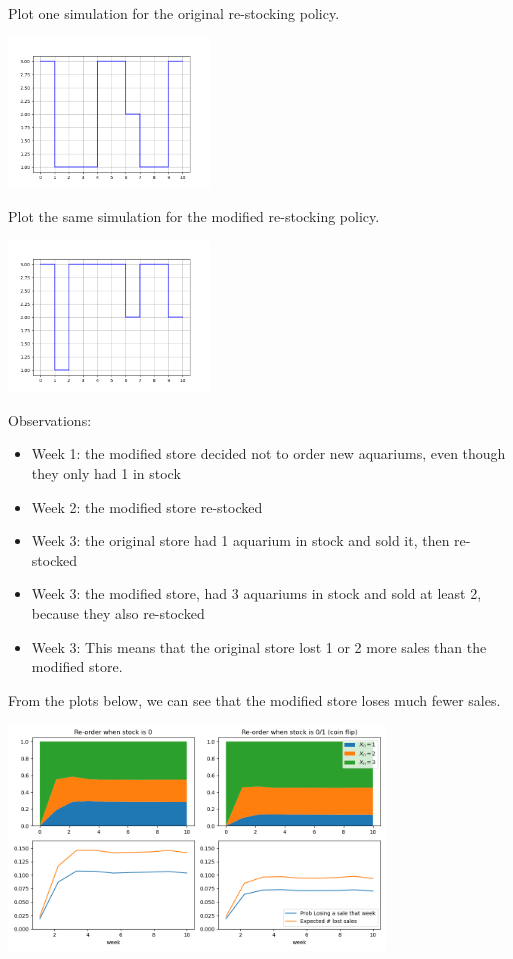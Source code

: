\begin{solution}
\begin{slide}
\begin{parts}	
	\item Plot one simulation for the original re-stocking policy.
	
		\includegraphics[width=0.4\textwidth]{images/aquarium-sim-og.png}
	\item Plot the same simulation for the modified re-stocking policy.
	
		\includegraphics[width=0.4\textwidth]{images/aquarium-sim-mod.png}
		
		
	Observations:
	\begin{itemize}
		\item Week 1: the modified store decided not to order new aquariums, even though they only had 1 in stock
		\item Week 2: the modified store re-stocked
		\item Week 3: the original store had 1 aquarium in stock and sold it, then re-stocked
		\item Week 3: the modified store, had 3 aquariums in stock and sold at least 2, because they also re-stocked
		\item Week 3: This means that the original store lost 1 or 2 more sales than the modified store.
	\end{itemize}	
	
	
	\item From the plots below, we can see that the modified store loses much fewer sales.
\end{parts}	

		\includegraphics[width=0.75\textwidth]{images/aquarium-sim.png}
	


\end{slide}
\end{solution}

